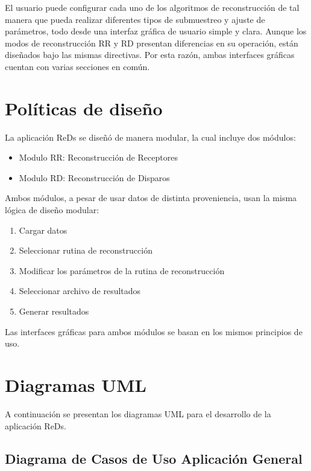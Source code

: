\documentclass[12pt,twoside,letter]{ol-softwaremanual}
\begin{document}
El usuario puede configurar cada uno de los algoritmos de reconstrucción de tal manera que pueda realizar diferentes tipos de submuestreo y ajuste de parámetros, todo desde una interfaz gráfica de usuario simple y clara. Aunque los modos de reconstrucción RR y RD presentan diferencias en su operación, están diseñados bajo las mismas directivas. Por esta razón, ambas interfaces gráficas cuentan con varias secciones en común.



\cleardoublepage

\section{Políticas de diseño}

La aplicación ReDs se diseñó de manera modular, la cual incluye dos módulos:

\begin{itemize}
	\item Modulo RR: Reconstrucción de Receptores
	\item Modulo RD: Reconstrucción de Disparos
\end{itemize}

Ambos módulos, a pesar de usar datos de distinta proveniencia, usan la misma lógica de diseño modular:

\begin{enumerate}
	\item Cargar datos
	\item Seleccionar rutina de reconstrucción
	\item Modificar los parámetros de la rutina de reconstrucción
	\item Seleccionar archivo de resultados
	\item Generar resultados
\end{enumerate}

Las interfaces gráficas para ambos módulos se basan en los mismos principios de uso.

\section{Diagramas UML}
A continuación se presentan los diagramas UML para el desarrollo de la aplicación ReDs.

\subsection{Diagrama de Casos de Uso Aplicación General}
\end{document}
